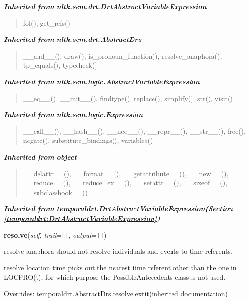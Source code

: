 \large{\textbf{\textit{Inherited from nltk.sem.drt.DrtAbstractVariableExpression}}}

\begin{quote}
fol(), get\_refs()
\end{quote}

\large{\textbf{\textit{Inherited from nltk.sem.drt.AbstractDrs}}}

\begin{quote}
\_\_and\_\_(), draw(), is\_pronoun\_function(), resolve\_anaphora(), tp\_equals(), typecheck()
\end{quote}

\large{\textbf{\textit{Inherited from nltk.sem.logic.AbstractVariableExpression}}}

\begin{quote}
\_\_eq\_\_(), \_\_init\_\_(), findtype(), replace(), simplify(), str(), visit()
\end{quote}

\large{\textbf{\textit{Inherited from nltk.sem.logic.Expression}}}

\begin{quote}
\_\_call\_\_(), \_\_hash\_\_(), \_\_neq\_\_(), \_\_repr\_\_(), \_\_str\_\_(), free(), negate(), substitute\_bindings(), variables()
\end{quote}

\large{\textbf{\textit{Inherited from object}}}

\begin{quote}
\_\_delattr\_\_(), \_\_format\_\_(), \_\_getattribute\_\_(), \_\_new\_\_(), \_\_reduce\_\_(), \_\_reduce\_ex\_\_(), \_\_setattr\_\_(), \_\_sizeof\_\_(), \_\_subclasshook\_\_()
\end{quote}

\large{\textbf{\textit{Inherited from temporaldrt.DrtAbstractVariableExpression\textit{(Section \ref{temporaldrt:DrtAbstractVariableExpression})}}}}

    \vspace{0.5ex}

\hspace{.8\funcindent}\begin{boxedminipage}{\funcwidth}

    \raggedright \textbf{resolve}(\textit{self}, \textit{trail}={\tt \texttt{[}\texttt{]}}, \textit{output}={\tt \texttt{[}\texttt{]}})

\setlength{\parskip}{2ex}
    resolve anaphora should not resolve individuals and events to time 
    referents.

    resolve location time picks out the nearest time referent other than 
    the one in LOCPRO(t), for which purpose the PossibleAntecedents class 
    is not used.

\setlength{\parskip}{1ex}
      Overrides: temporaldrt.AbstractDrs.resolve 	extit{(inherited documentation)}

    \end{boxedminipage}


